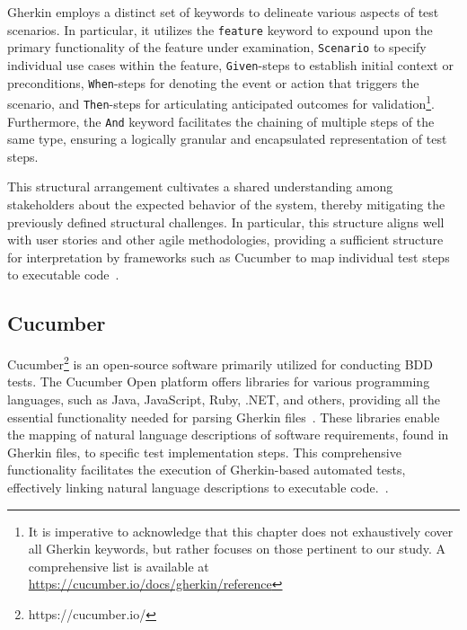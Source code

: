  Gherkin employs a distinct set of keywords to delineate various aspects of test scenarios. In particular, it utilizes the \texttt{feature} keyword to expound upon the primary functionality of the feature under examination, \texttt{Scenario} to specify individual use cases within the feature, \texttt{Given}-steps to establish initial context or preconditions, \texttt{When}-steps for denoting the event or action that triggers the scenario, and \texttt{Then}-steps for articulating anticipated outcomes for validation\footnote{It is imperative to acknowledge that this chapter does not exhaustively cover all Gherkin keywords, but rather focuses on those pertinent to our study. A comprehensive list is available at \href{https://cucumber.io/docs/gherkin/reference/\#keywords}{https://cucumber.io/docs/gherkin/reference}}. Furthermore, the \texttt{And} keyword facilitates the chaining of multiple steps of the same type, ensuring a logically granular and encapsulated representation of test steps. 
 
 This structural arrangement cultivates a shared understanding among stakeholders about the expected behavior of the system, thereby mitigating the previously defined structural challenges. In particular, this structure aligns well with user stories and other agile methodologies, providing a sufficient structure for interpretation by frameworks such as Cucumber to map individual test steps to executable code~\cite{noauthor_gherkin_nodate}.


\subsection{Cucumber}
\label{subsec:cucumber}
Cucumber\footnote{https://cucumber.io/} is an open-source software primarily utilized for conducting \ac{BDD} tests. The Cucumber Open platform offers libraries for various programming languages, such as Java, JavaScript, Ruby, .NET, and others, providing all the essential functionality needed for parsing Gherkin files~\cite{noauthor_cucumber_nodate}. These libraries enable the mapping of natural language descriptions of software requirements, found in Gherkin files, to specific test implementation steps. This comprehensive functionality facilitates the execution of Gherkin-based automated tests, effectively linking natural language descriptions to executable code.~\cite{wynne2012cucumber}.

